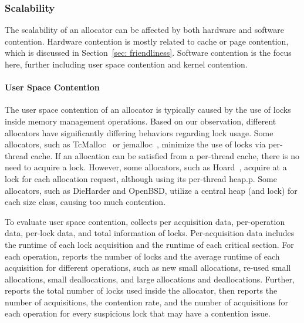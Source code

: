 \subsubsection{Scalability} 
\label{sec:scalability}

The scalability of an allocator can be affected by both hardware and software contention. Hardware contention is mostly related to cache or page contention, which is discussed in Section~\ref{sec: friendliness}. Software contention is the focus here, further including user space contention and kernel contention. 

\paragraph{User Space Contention} The user space contention of an allocator is typically caused by the use of locks inside memory management operations. Based on our observation, different allocators have significantly differing behaviors regarding lock usage. Some allocators, such as TcMalloc~\citep{tcmalloc} or jemalloc~\citep{jemalloc}, minimize the use of locks via per-thread cache. If an allocation can be satisfied from a per-thread cache, there is no need to acquire a lock. However, some allocators, such as Hoard~\citep{Hoard}, acquire at a lock for each allocation request, although using its per-thread heap.p. Some allocators, such as DieHarder and OpenBSD, utilize a central heap (and lock) for each size class, causing too much contention. 


To evaluate user space contention, \MP{} collects per acquisition data, per-operation data, per-lock data, and total information of locks. Per-acquisition data includes the runtime of each lock acquisition and the runtime of each critical section. For each operation, \MP{} reports the number of locks and the average runtime of each acquisition for different operations, such as new small allocations, re-used small allocations, small deallocations, and large allocations and deallocations. Further, \MP{} reports the total number of locks used inside the allocator, then reports the number of acquisitions, the contention rate, and the number of acquisitions for each operation for every suspicious lock that may have a contention issue. 
 
